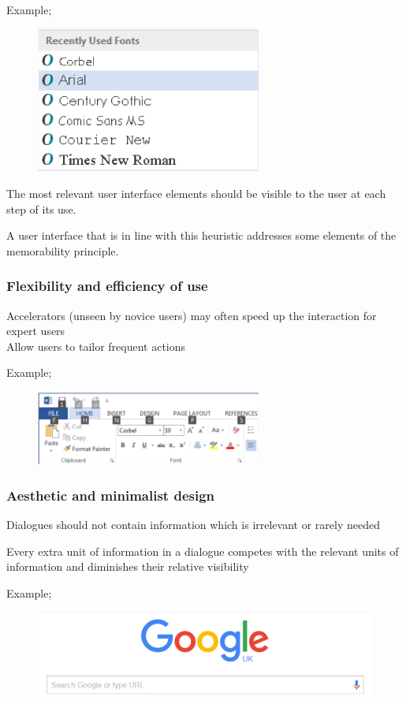 \documentclass[]{project_plan}
\begin{document}
Example;
\begin{figure}[h!]
  \centering
  \includegraphics[width=20em]{recognition_rather_than_recall_example.png}
\end{figure}

The most relevant user interface elements should be visible to the user at each step of its use.

A user interface that is in line with this heuristic addresses some elements of the memorability principle.

\newpage

\subsubsection{Flexibility and efficiency of use}
Accelerators (unseen by novice users) may often speed up the interaction for expert users\\
Allow users to tailor frequent actions

Example;
\begin{figure}[h!]
  \centering
  \includegraphics[width=20em]{flexibility_and_efficiency_of_use_example.png}
\end{figure}

\subsubsection{Aesthetic and minimalist design}
Dialogues should not contain information which is irrelevant or rarely needed

Every extra unit of information in a dialogue competes with the relevant units of
information and diminishes their relative visibility

Example;
\begin{figure}[h!]
  \centering
  \includegraphics[width=\linewidth]{aesthetic_and_minimalist_design_example.png}
\end{figure}
\end{document}
